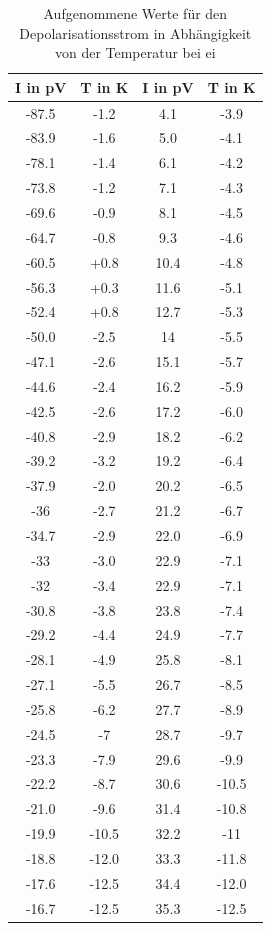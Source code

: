\begin{table}[H]
\centering
  \caption{Aufgenommene Werte für den Depolarisationsstrom in Abhängigkeit von der Temperatur bei ei}
  \label{tab:daten2}
  \begin{tabular}{c|c|c|c}
I in pV& T in K&I in pV& T in K\\
    \hline
    -87.5& -1.2&4.1& -3.9\\
    -83.9& -1.6& 5.0& -4.1\\
    -78.1& -1.4&6.1& -4.2\\
    -73.8& -1.2&7.1& -4.3\\
    -69.6& -0.9&8.1& -4.5\\
    -64.7& -0.8&9.3& -4.6\\
    -60.5& +0.8&10.4& -4.8\\
    -56.3& +0.3&11.6& -5.1\\
    -52.4& +0.8&12.7& -5.3\\
    -50.0& -2.5&14& -5.5\\
    -47.1& -2.6&15.1& -5.7\\
    -44.6& -2.4&16.2& -5.9\\
    -42.5& -2.6&17.2& -6.0\\
    -40.8& -2.9&18.2& -6.2\\
    -39.2& -3.2&19.2& -6.4\\
    -37.9& -2.0&20.2& -6.5\\
    -36& -2.7&21.2& -6.7\\
    -34.7& -2.9&22.0& -6.9\\
    -33& -3.0&22.9& -7.1\\
    -32& -3.4&22.9& -7.1\\
    -30.8& -3.8&23.8& -7.4\\
    -29.2& -4.4&24.9& -7.7\\
    -28.1& -4.9&25.8& -8.1\\
    -27.1& -5.5&26.7& -8.5\\
    -25.8& -6.2&27.7& -8.9\\
    -24.5& -7&28.7& -9.7\\
    -23.3& -7.9&29.6& -9.9\\
    -22.2& -8.7&30.6& -10.5\\
    -21.0& -9.6&31.4& -10.8\\
    -19.9& -10.5&32.2& -11\\
    -18.8& -12.0&33.3& -11.8\\
    -17.6& -12.5&34.4& -12.0\\
    -16.7& -12.5&35.3& -12.5\\

\end{tabular}
\end{table}
